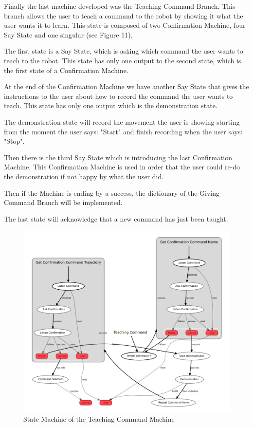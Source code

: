 Finally the last machine developed was the Teaching Command Branch. This branch allows the user to teach a command to the robot by showing it what the user wants it to learn. This state is composed of two Confirmation Machine, four Say State and one singular (see Figure 11).

The first state is a Say State, which is asking which command the user wants to teach to the robot. This state has only one output to the second state, which is the first state of a Confirmation Machine.

At the end of the Confirmation Machine we have another Say State that gives the instructions to the user about how to record the command the user wants to teach. This state has only one output which is the demonstration state.

The demonstration state will record the movement the user is showing starting from the moment the user says: "Start" and finish recording when the user says: "Stop".
  
Then there is the third Say State which is introducing the last Confirmation Machine. This Confirmation Machine is used in order that the user could re-do the demonstration if not happy by what the user did. 

Then if the Machine is ending by a success, the dictionary of the Giving Command Branch will be implemented.

The last state will acknowledge that a new command has just been taught.

 \begin{figure}
 \center
 \includegraphics[width=16cm]{img_SM/TeachingCommandBranch.png}
 \caption{State Machine of the Teaching Command Machine}
 \end{figure}

